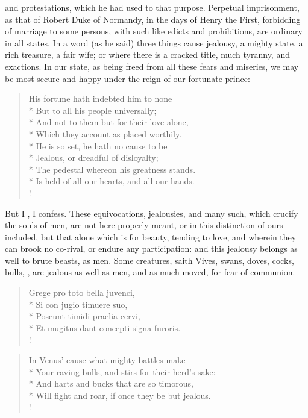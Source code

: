 and protestations, which he had used to that purpose. Perpetual
imprisonment, as that of Robert Duke of Normandy, in the days of
Henry the First, forbidding of marriage to some persons, with such like
edicts and prohibitions, are ordinary in all states. In a word
(as he said) three things cause jealousy, a mighty state, a rich
treasure, a fair wife; or where there is a cracked title, much tyranny,
and exactions. In our state, as being freed from all these fears and
miseries, we may be most secure and happy under the reign of our
fortunate prince:
%
\begin{verse}%
His fortune hath indebted him to none\\*
But to all his people universally;\\*
And not to them but for their love alone,\\*
Which they account as placed worthily.\\*
He is so set, he hath no cause to be\\*
Jealous, or dreadful of disloyalty;\\*
The pedestal whereon his greatness stands.\\*
Is held of all our hearts, and all our hands.\\!
\end{verse}%
%

But I , I confess. These equivocations, jealousies, and many such,
which crucify the souls of men, are not here properly meant, or in this
distinction of ours included, but that alone which is for beauty,
tending to love, and wherein they can brook no co-rival, or endure any
participation: and this jealousy belongs as well to brute beasts, as
men. Some creatures, saith Vives, swans, doves, cocks, bulls,
\etc{}, are jealous as well as men, and as much moved, for fear of
communion.
%
\begin{latin}%
\begin{verse}%
Grege pro toto bella juvenci,\\*
Si con jugio timuere suo,\\*
Poscunt timidi praelia cervi,\\*
Et mugitus dant concepti signa furoris.\\!
\end{verse}%
\end{latin}%
\translationrule%
\begin{verse}%
In Venus' cause what mighty battles make\\*
Your raving bulls, and stirs for their herd's sake:\\*
And harts and bucks that are so timorous,\\*
Will fight and roar, if once they be but jealous.\\!
\end{verse}%
%

